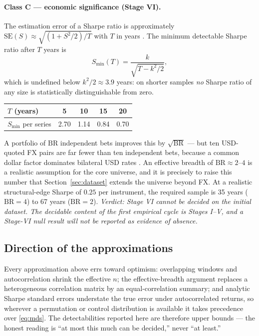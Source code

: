 \documentclass[11pt,a4paper]{article}
\numberwithin{equation}{section}
\begin{document}
\paragraph{Class C --- economic significance (Stage VI).}
The estimation error of a Sharpe ratio is approximately
$\mathrm{SE}(S)\approx\sqrt{(1+S^2/2)/T}$ with $T$ in years
\cite{Lo2002}. The minimum detectable Sharpe ratio after $T$ years
is
\begin{equation}
S_{\min}(T)=\frac{k}{\sqrt{T-k^2/2}},
\label{eq:mds}
\end{equation}
which is undefined below $k^2/2\approx3.9$ years: on shorter
samples \emph{no} Sharpe ratio of any size is statistically
distinguishable from zero.
\begin{center}
\begin{tabular}{lcccc}
\toprule
$T$ (years) & 5 & 10 & 15 & 20\\
\midrule
$S_{\min}$ per series & 2.70 & 1.14 & 0.84 & 0.70\\
\bottomrule
\end{tabular}
\end{center}
A portfolio of $\mathrm{BR}$ independent bets improves this by
$\sqrt{\mathrm{BR}}$ --- but ten USD-quoted FX pairs are far fewer
than ten independent bets, because a common dollar factor dominates
bilateral USD rates \cite{Verdelhan2018}. An effective breadth of
$\mathrm{BR}\approx2$--$4$ is a realistic assumption for the core
universe, and it is precisely to raise this number that
Section~\ref{sec:dataset} extends the universe beyond FX. At a
realistic structural-edge Sharpe of $0.25$ per instrument, the
required sample is 35 years ($\mathrm{BR}=4$) to 67 years
($\mathrm{BR}=2$). \emph{Verdict: Stage VI cannot be decided on the
initial dataset. The decidable content of the first empirical cycle
is Stages I--V, and a Stage-VI null result will not be reported as
evidence of absence.}

\subsection{Direction of the approximations}

Every approximation above errs toward optimism: overlapping windows
and autocorrelation shrink the effective $n$; the effective-breadth
argument replaces a heterogeneous correlation matrix by an
equal-correlation summary; and analytic Sharpe standard errors
understate the true error under autocorrelated returns, so wherever
a permutation or control distribution is available it takes
precedence over \eqref{eq:mds}. The detectabilities reported here
are therefore upper bounds --- the honest reading is ``at most this
much can be decided,'' never ``at least.''
\end{document}
